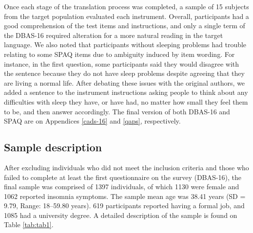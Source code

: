 \documentclass[
  ,doc,11pt, twoside,floatsintext]{apa6}
\begin{document}
Once each stage of the translation process was completed, a sample of 15 subjects from the target population evaluated each instrument. Overall, participants had a good comprehension of the test items and instructions, and only a single term of the DBAS-16 required alteration for a more natural reading in the target language. We also noted that participants without sleeping problems had trouble relating to some SPAQ items due to ambiguity induced by item wording. For instance, in the first question, some participants said they would disagree with the sentence because they do not have sleep problems despite agreeing that they are living a normal life. After debating these issues with the original authors, we added a sentence to the instrument instructions asking people to think about any difficulties with sleep they have, or have had, no matter how small they feel them to be, and then answer accordingly. The final version of both DBAS-16 and SPAQ are on Appendices \ref{cads-16} and \ref{qaps}, respectively.

\hypertarget{sample-description}{%
\subsection{Sample description}\label{sample-description}}

After excluding individuals who did not meet the inclusion criteria and those who failed to complete at least the first questionnaire on the survey (DBAS-16), the final sample was comprised of 1397 individuals, of which 1130 were female and 1062 reported insomnia symptoms. The sample mean age was 38.41 years (SD = 9.79, Range: 18--59.80 years). 619 participants reported having a formal job, and 1085 had a university degree. A detailed description of the sample is found on Table \ref{tab:tab1}.
\end{document}
